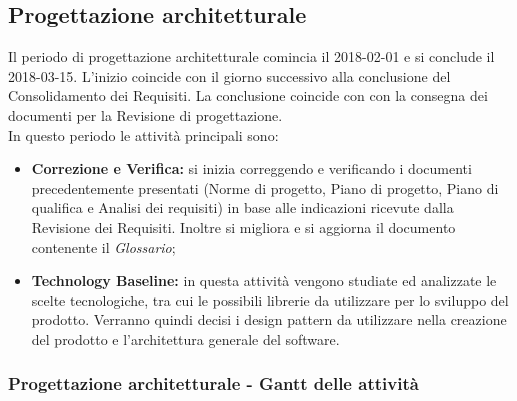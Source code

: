 \subsection{Progettazione architetturale}
Il periodo di progettazione architetturale comincia il 2018-02-01 e si conclude il 2018-03-15. L'inizio coincide con il giorno successivo alla conclusione del Consolidamento dei Requisiti. La conclusione coincide con con la consegna dei documenti per la Revisione di progettazione. \\
In questo periodo le attività principali sono:
\begin{itemize}
	\item \textbf{Correzione e Verifica:} si inizia correggendo e verificando i documenti precedentemente presentati (Norme di progetto, Piano di progetto, Piano di qualifica e Analisi dei requisiti) in base alle indicazioni ricevute dalla Revisione dei Requisiti. Inoltre si migliora e si aggiorna il documento contenente il \textit{Glossario};
	\item \textbf{Technology Baseline:} in questa attività vengono studiate ed analizzate le scelte tecnologiche, tra cui le possibili librerie da utilizzare per lo sviluppo del prodotto. Verranno quindi decisi i design pattern da utilizzare nella creazione del prodotto e l'architettura generale del software.
\end{itemize}

\subsubsection{Progettazione architetturale - Gantt delle attività}

\pagebreak
